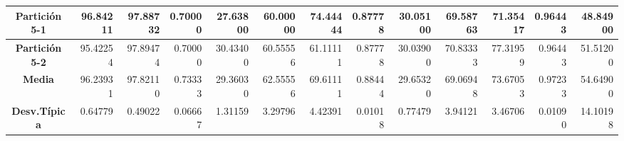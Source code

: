 \documentclass[a4paper,11pt]{article}
\begin{document}
\begin{table}[H]
\begin{adjustbox}{width=1.1\textwidth}
\begin{tabular}{|c|r|r|r|r|r|r|r|r|r|r|r|r|}
  \textbf{Partición 5-1} & 96.84211 & 97.88732 & 0.70000 & 27.63800 & 60.00000 & 74.44444 & 0.87778 & 30.05100 & 69.58763 & 71.35417 & 0.96443 & 48.84900 \\ \hline
  \textbf{Partición 5-2} & 95.42254 & 97.89474 & 0.70000 & 30.43400 & 60.55556 & 61.11111 & 0.87778 & 30.03900 & 70.83333 & 77.31959 & 0.96443 & 51.51200 \\ \hline
  \textbf{Media} & 96.23931 & 97.82110 & 0.73333 & 29.36030 & 62.55556 & 69.61111 & 0.88444 & 29.65320 & 69.06948 & 73.67053 & 0.97233 & 54.64900 \\ \hline
  \textbf{Desv.Típica} & 0.64779 & 0.49022 & 0.06667 & 1.31159 & 3.29796 & 4.42391 & 0.01018 & 0.77479 & 3.94121 & 3.46706 & 0.01090 & 14.10198 \\ \hline
  \end{tabular}
  \end{adjustbox}
  \label{AGG}
  \end{table}
  
\end{document}
